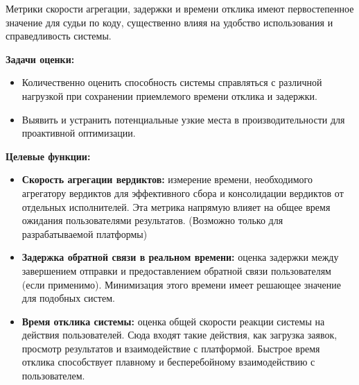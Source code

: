 

Метрики скорости агрегации, задержки и времени отклика имеют первостепенное значение для судьи по коду, существенно влияя на удобство использования и справедливость системы.

\textbf{Задачи оценки:}
\noindent
\begin{itemize}
    \item Количественно оценить способность системы справляться с различной нагрузкой при сохранении приемлемого времени отклика и задержки.
    \item Выявить и устранить потенциальные узкие места в производительности для проактивной оптимизации.
\end{itemize}

\textbf{Целевые функции:}
\noindent
\begin{itemize}
    \item \textbf{Скорость агрегации вердиктов:} измерение времени, необходимого агрегатору вердиктов для эффективного сбора и консолидации вердиктов от отдельных исполнителей. Эта метрика напрямую влияет на общее время ожидания пользователями результатов. (Возможно только для разрабатываемой платформы)
    \item \textbf{Задержка обратной связи в реальном времени:} оценка задержки между завершением отправки и предоставлением обратной связи пользователям (если применимо). Минимизация этого времени имеет решающее значение для подобных систем.
    \item \textbf{Время отклика системы:} оценка общей скорости реакции системы на действия пользователей. Сюда входят такие действия, как загрузка заявок, просмотр результатов и взаимодействие с платформой. Быстрое время отклика способствует плавному и бесперебойному взаимодействию с пользователем.
\end{itemize}

